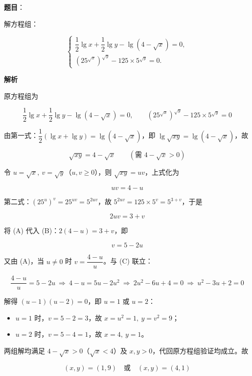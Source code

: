 \begin{answer}

\textbf{题目}：

解方程组：

\nopagebreak[4]
\[
\begin{cases}
\dfrac12\lg x+\dfrac12\lg y-\lg(4-\sqrt{x})=0,\\[2pt]
\left(25^{\sqrt{x}}\right)^{\sqrt{y}}-125\times5^{\sqrt{y}}=0.
\end{cases}
\]

\textbf{解析}

原方程组为

\nopagebreak[4]
\[
\frac12\lg x+\frac12\lg y-\lg(4-\sqrt{x})=0,\qquad
\left(25^{\sqrt{x}}\right)^{\sqrt{y}}-125\times5^{\sqrt{y}}=0
\]

由第一式：$\dfrac12(\lg x+\lg y)=\lg(4-\sqrt x)$，即 $\lg\sqrt{xy}=\lg(4-\sqrt x)$，故

\nopagebreak[4]
\[
\sqrt{xy}=4-\sqrt x\qquad(\text{需 }4-\sqrt x>0)
\]

令 $u=\sqrt x,\ v=\sqrt y$（$u,v\ge0$），则 $\sqrt{xy}=uv$，上式化为

\nopagebreak[4]
\[
uv=4-u\tag{A}
\]

第二式：$\left(25^{u}\right)^{v}=25^{uv}=5^{2uv}$，故 $5^{2uv}=125\times5^{v}=5^{3+v}$，于是

\nopagebreak[4]
\[
2uv=3+v\tag{B}
\]

将 (A) 代入 (B)：$2(4-u)=3+v$，即

\nopagebreak[4]
\[
v=5-2u\tag{C}
\]

又由 (A)，当 $u\ne0$ 时 $v=\dfrac{4-u}{u}$。与 (C) 联立：

\nopagebreak[4]
\[
\frac{4-u}{u}=5-2u\ \Longrightarrow\ 4-u=5u-2u^2\ \Longrightarrow\ 2u^2-6u+4=0\ \Longrightarrow\ u^2-3u+2=0
\]

解得 $(u-1)(u-2)=0$，即 $u=1$ 或 $u=2$：

\begin{itemize}
\item $u=1$ 时，$v=5-2=3$，故 $x=u^2=1,\ y=v^2=9$；
\item $u=2$ 时，$v=5-4=1$，故 $x=4,\ y=1$。
\end{itemize}

两组解均满足 $4-\sqrt x>0$（$\sqrt x<4$）及 $x,y>0$，代回原方程组验证均成立。故

\nopagebreak[4]
\[
(x,y)=(1,9)\quad\text{或}\quad(x,y)=(4,1)
\]


\end{answer}
